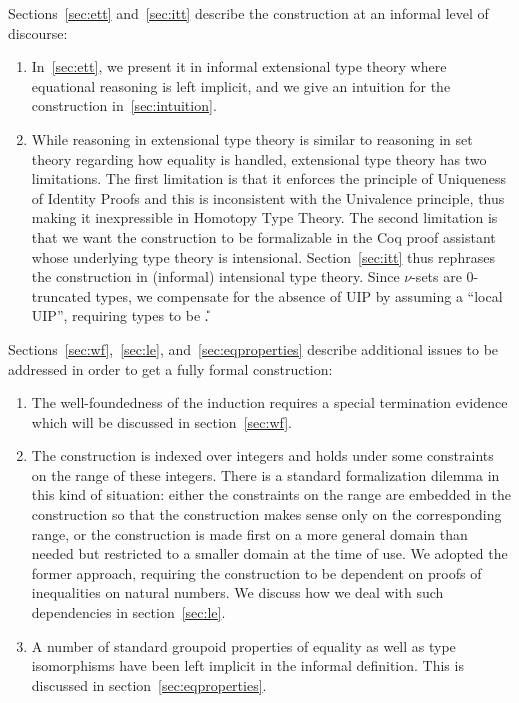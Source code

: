 \documentclass{art.cls/art}
\begin{document}
Sections~\ref{sec:ett} and~\ref{sec:itt} describe the construction at an informal level of discourse:
\begin{enumerate}
  \item In~\ref{sec:ett}, we present it in informal extensional type theory where equational reasoning is left implicit, and we give an intuition for the construction in~\ref{sec:intuition}.
  \item While reasoning in extensional type theory is similar to reasoning in set theory regarding how equality is handled, extensional type theory has two limitations. The first limitation is that it enforces the principle of Uniqueness of Identity Proofs and this is inconsistent with the Univalence principle, thus making it inexpressible in Homotopy Type Theory. The second limitation is that we want the construction to be formalizable in the Coq proof assistant whose underlying type theory is intensional. Section~\ref{sec:itt} thus rephrases the construction in (informal) intensional type theory. Since $\nu$-sets are $0$-truncated types, we compensate for the absence of UIP by assuming a ``local UIP'', requiring types to be \U.
\end{enumerate}

Sections~\ref{sec:wf},~\ref{sec:le}, and~\ref{sec:eqproperties} describe additional issues to be addressed in order to get a fully formal construction:
\begin{enumerate}
  \item The well-foundedness of the induction requires a special termination evidence which will be discussed in section~\ref{sec:wf}.
  \item The construction is indexed over integers and holds under some constraints on the range of these integers. There is a standard formalization dilemma in this kind of situation: either the constraints on the range are embedded in the construction so that the construction makes sense only on the corresponding range, or the construction is made first on a more general domain than needed but restricted to a smaller domain at the time of use. We adopted the former approach, requiring the construction to be dependent on proofs of inequalities on natural numbers. We discuss how we deal with such dependencies in section~\ref{sec:le}.
  \item A number of standard groupoid properties of equality as well as type isomorphisms have been left implicit in the informal definition. This is discussed in section~\ref{sec:eqproperties}.
\end{enumerate}
\end{document}
